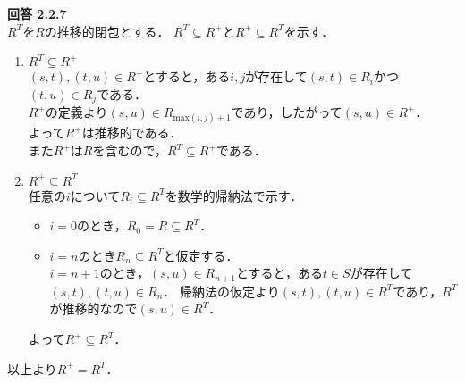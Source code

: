 \documentclass[a4paper,11pt,fleqn,dvipdfmx]{article}
\newcommand{\ansja}[1]{\noindent\textbf{回答 #1}\\[2mm]}
\newcommand{\owari}[0]{\hfill\fbox{}}
\begin{document}
    \pagebreak

    \ansja{2.2.7}
        $R^{T}$を$R$の推移的閉包とする． $R^{T} \subseteq R^{+}$と$R^{+} \subseteq R^{T}$を示す．
        \begin{enumerate}
            \item $R^{T} \subseteq R^{+}$ \\[2mm]
            $(s,t),(t,u) \in R^{+}$とすると，ある$i,j$が存在して$(s,t) \in R_i$かつ$(t,u) \in R_j$である． \\
            $R^{+}$の定義より$(s,u) \in R_{\mathrm{max}(i,j)+1}$であり，したがって$(s,u) \in R^{+}$． \\
            よって$R^{+}$は推移的である． \\
            また$R^{+}$は$R$を含むので，$R^{T} \subseteq R^{+}$である．
            \item $R^{+} \subseteq R^{T}$ \\[2mm]
            任意の$i$について$R_i \subseteq R^{T}$を数学的帰納法で示す．
            \begin{itemize}
                \item $i=0$のとき，$R_0 = R \subseteq R^{T}$．
                \item $i=n$のとき$R_n \subseteq R^{T}$と仮定する． \\
                $i=n+1$のとき，$(s,u) \in R_{n+1}$とすると，ある$t \in S$が存在して$(s,t),(t,u) \in R_n$．
                帰納法の仮定より$(s,t),(t,u) \in R^{T}$であり，$R^{T}$が推移的なので$(s,u) \in R^{T}$．
            \end{itemize}
            よって$R^{+} \subseteq R^{T}$．
        \end{enumerate}
        以上より$R^{+} = R^{T}$．\owari

    \vspace{10mm}
\end{document}
